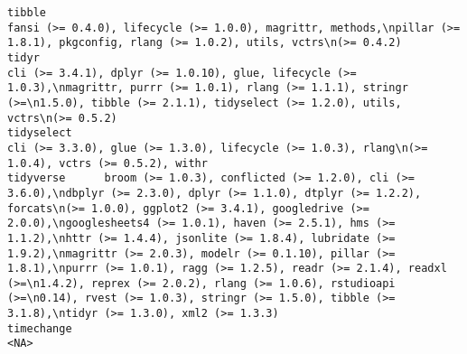 \documentclass[
  letterpaper,
  DIV=11,
  numbers=noendperiod]{scrreprt}
\begin{document}
\begin{verbatim}
tibble                                                                                                                                                                                                                                                                                                                                                                                                                                                                                fansi (>= 0.4.0), lifecycle (>= 1.0.0), magrittr, methods,\npillar (>= 1.8.1), pkgconfig, rlang (>= 1.0.2), utils, vctrs\n(>= 0.4.2)
tidyr                                                                                                                                                                                                                                                                                                                                                                                                                cli (>= 3.4.1), dplyr (>= 1.0.10), glue, lifecycle (>= 1.0.3),\nmagrittr, purrr (>= 1.0.1), rlang (>= 1.1.1), stringr (>=\n1.5.0), tibble (>= 2.1.1), tidyselect (>= 1.2.0), utils, vctrs\n(>= 0.5.2)
tidyselect                                                                                                                                                                                                                                                                                                                                                                                                                                                                                                               cli (>= 3.3.0), glue (>= 1.3.0), lifecycle (>= 1.0.3), rlang\n(>= 1.0.4), vctrs (>= 0.5.2), withr
tidyverse      broom (>= 1.0.3), conflicted (>= 1.2.0), cli (>= 3.6.0),\ndbplyr (>= 2.3.0), dplyr (>= 1.1.0), dtplyr (>= 1.2.2), forcats\n(>= 1.0.0), ggplot2 (>= 3.4.1), googledrive (>= 2.0.0),\ngooglesheets4 (>= 1.0.1), haven (>= 2.5.1), hms (>= 1.1.2),\nhttr (>= 1.4.4), jsonlite (>= 1.8.4), lubridate (>= 1.9.2),\nmagrittr (>= 2.0.3), modelr (>= 0.1.10), pillar (>= 1.8.1),\npurrr (>= 1.0.1), ragg (>= 1.2.5), readr (>= 2.1.4), readxl (>=\n1.4.2), reprex (>= 2.0.2), rlang (>= 1.0.6), rstudioapi (>=\n0.14), rvest (>= 1.0.3), stringr (>= 1.5.0), tibble (>= 3.1.8),\ntidyr (>= 1.3.0), xml2 (>= 1.3.3)
timechange                                                                                                                                                                                                                                                                                                                                                                                                                                                                                                                                                                                                            <NA>

\end{verbatim}
\end{document}
